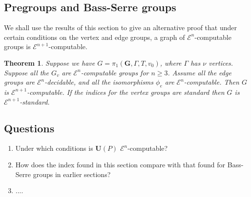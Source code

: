 \documentclass[a4paper]{article}
\newcommand{\grz}[1]{$\mathcal{E}^{#1}$}	%
\newcommand{\Uvec}{\mathbf{U}}	%
\newcommand{\fgoagog}{\pi_1(\mathbf{G},\Gamma,T,v_0)}	%
\newcommand{\UP}{\Uvec(P)}
\newcommand{\be}{\begin{enumerate}}
\newcommand{\ee}{\end{enumerate}}
\theoremstyle{plain}
\newtheorem{theorem}{Theorem}[section]
\theoremstyle{definition}
\begin{document}
\subsection{Pregroups and Bass-Serre groups}
We shall use the results of this section to give an alternative
proof  that under certain conditions on the vertex and 
edge groups, a graph of \grz{n}-computable groups is \grz{n+1}-computable. 

\begin{theorem} \label{thm:fgoagogcomp1}
Suppose we have $G = \fgoagog$, where $\Gamma$ has $\nu$ vertices. Suppose 
all the $G_v$ are \grz{n}-computable groups for $n \geq 3$. Assume all the edge groups are \grz{n}-decidable, and all the isomorphisms $\phi_e$ are \grz{n}-computable. Then $G$ is \grz{n+1}-computable. If the indices
for the vertex groups are standard then $G$ is \grz{n+1}-standard. 
\end{theorem}

\subsection{Questions}
\be
\item Under which conditions is $\UP$ \grz{n}-computable?
\item How does the index found in this section compare with that found for Bass-Serre groups in
earlier sections?
\item ....
\ee


\end{document}
